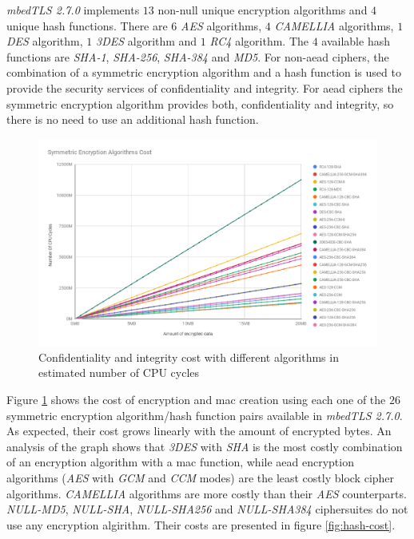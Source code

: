 \textit{mbedTLS 2.7.0} implements $13$ non-null unique encryption algorithms and $4$ unique hash functions. There are $6$ \textit{AES} 
algorithms, $4$ \textit{CAMELLIA} algorithms,
$1$ \textit{DES} algorithm, $1$ \textit{3DES} algorithm and $1$ \textit{RC4} algorithm. The $4$ available hash functions are \textit{SHA-1}, 
\textit{SHA-256}, \textit{SHA-384} and \textit{MD5}.
For non-\gls{aead} ciphers, the combination of a symmetric encryption algorithm and a hash function is used to provide the security services of confidentiality and 
integrity. For \gls{aead} ciphers the symmetric encryption algorithm provides both, confidentiality and integrity, so there is no need
to use an additional hash function.

\begin{figure}
  \centering
  \includegraphics[width=1.0\textwidth]{img/sym_algs_cc2.png}
  \centering \caption{\label{fig:symm-encr-all} Confidentiality and integrity cost with different algorithms in estimated number of CPU cycles}
\end{figure}

Figure \ref{fig:symm-encr-all} shows the cost of encryption and \gls{mac} creation using each one of the $26$ symmetric encryption 
algorithm/hash function pairs available in \textit{mbedTLS 2.7.0}. As expected, their cost grows linearly with the amount of encrypted bytes.
An analysis of the graph shows that \textit{3DES} with \textit{SHA} is the most costly combination of an encryption algorithm with a \gls{mac} function, 
while \gls{aead} encryption algorithms 
(\textit{AES} with \textit{GCM} and \textit{CCM} modes) are the least costly block cipher algorithms. 
\textit{CAMELLIA} algorithms are more costly than their \textit{AES} counterparts. \textit{NULL-MD5}, \textit{NULL-SHA}, \textit{NULL-SHA256} and \textit{NULL-SHA384}
ciphersuites do not use any encryption algirithm. Their costs are presented in figure \ref{fig:hash-cost}.


